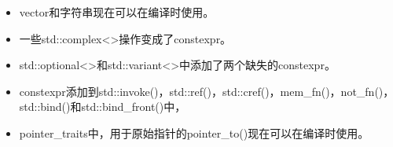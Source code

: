 \begin{itemize}
\item 
vector和字符串现在可以在编译时使用。

\item 
一些std::complex<>操作变成了constexpr。

\item 
std::optional<>和std::variant<>中添加了两个缺失的constexpr。

\item 
constexpr添加到std::invoke()，std::ref()，std::cref()，mem\_fn()，not\_fn()，std::bind()和std::bind\_front()中，

\item 
pointer\_traits中，用于原始指针的pointer\_to()现在可以在编译时使用。
\end{itemize}

















